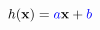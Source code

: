 \documentclass[12pt]{standalone}
\begin{document}
	\begin{varwidth}{50in}
		\begin{equation*}
		h(\mathbf{x}) = \textcolor{blue}{a}\mathbf{x} + \textcolor{blue}{b}
		\end{equation*}
	\end{varwidth}
	
\vspace{2cm}
\end{document}
